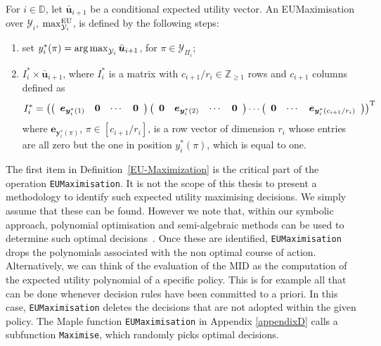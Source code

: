 \begin{definition}[EUMaximisation]
\label{EU-Maximization}
For $i\in \mathbb{D}$, let $\bar{\bm{u}}_{i+1}$ be a conditional expected utility vector. An EUMaximisation over $\mathcal{Y}_i$, $\max^{\textnormal{EU}}_{\mathcal{Y}_i}$,  is defined by the following steps: 
 \begin{enumerate}
\item set $y_i^*(\pi)=\operatorname*{arg\,max}_{\mathcal{Y}_i}\bar{\bm{u}}_{i+1}$, for $\pi\in\bm{\mathcal{Y}}_{\Pi_i}$;
\item $I_i^*\times \bar{\bm{u}}_{i+1}$, where  $I_i^*$ is a matrix with $c_{i+1}/r_{i}\in\mathbb{Z}_{\geq 1}$ rows and $c_{i+1}$ columns  defined as
\[
I_i^*=\left(
\left(
\begin{array}{cccc}
\bm{e}_{\bm{y}_i^*(1)}&\bm{0}&\cdots&\bm{0}
\end{array}
\right)
\left(
\begin{array}{cccc}
\bm{0}&\bm{e}_{\bm{y}^*_i(2)}&\cdots&\bm{0}
\end{array}
\right)
\cdots
\left(
\begin{array}{ccc}
\bm{0}&\cdots&\bm{e}_{\bm{y}^*_i(c_{i+1}/r_{i})}
\end{array}
\right)
\right)^{\textnormal{T}}
\]
where $\bm{e}_{\bm{y}^*_i(\pi)}$, $\pi\in[c_{i+1}/r_{i}]$, is a row vector of dimension $r_{i}$ whose entries are all zero but the one in position $y_i^*(\pi)$, which is equal to one.
\end{enumerate} 
\end{definition}
The first item in Definition~\ref{EU-Maximization} is the critical part of the operation \texttt{EUMaximisation}. It is not the scope of this thesis to present a methodology to identify such expected utility maximising decisions. We simply assume that these can be found. However we note that, within our symbolic approach, polynomial optimisation and semi-algebraic methods can be used to determine such optimal decisions~\citep{parrilo2000}.  Once these are identified, \texttt{EUMaximisation} drops the polynomials associated with the non optimal course of action. Alternatively, we can think of  the evaluation of the MID as the computation of the expected utility polynomial of a specific policy. This is for example all that can be done whenever decision rules have been committed to a priori. In this case, \texttt{EUMaximisation} deletes the decisions that are not adopted within the given  policy. The Maple function \texttt{EUMaximisation} in Appendix \ref{appendixD} calls a subfunction \texttt{Maximise}, which randomly picks optimal decisions. 

